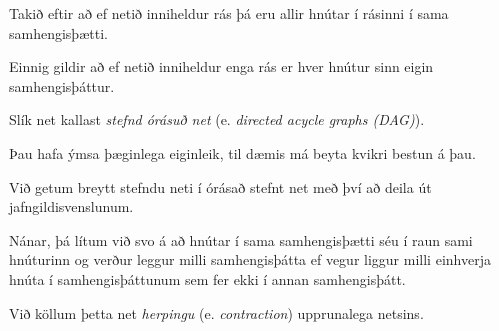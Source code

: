 {
	{
		\item<1-> Takið eftir að ef netið inniheldur rás þá eru allir hnútar í rásinni í sama samhengisþætti.
		\item<2-> Einnig gildir að ef netið inniheldur enga rás er hver hnútur sinn eigin samhengisþáttur.
		\item<3-> Slík net kallast \emph{stefnd órásuð net} (e. \emph{directed acycle graphs (DAG)}).
		\item<4-> Þau hafa ýmsa þæginlega eiginleik, til dæmis má beyta kvikri bestun á þau.
		\item<5-> Við getum breytt stefndu neti í órásað stefnt net með því að deila út jafngildisvenslunum.
		\item<6-> Nánar, þá lítum við svo á að hnútar í sama samhengisþætti séu í raun sami hnúturinn
					og verður leggur milli samhengisþátta ef vegur liggur milli einhverja hnúta í samhengisþáttunum sem fer ekki í annan samhengisþátt.
		\item<7-> Við köllum þetta net \emph{herpingu} (e. \emph{contraction}) upprunalega netsins.
	}
}

